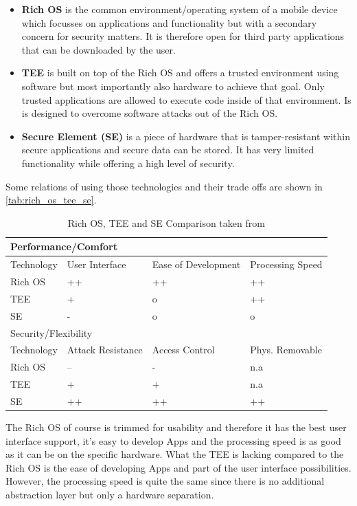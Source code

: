 \begin{itemize}
\item \textbf{Rich OS} is the common environment/operating system of a mobile device which focusses on applications and functionality but with a secondary concern for security matters. It is therefore open for third party applications
that can be downloaded by the user.
\item \textbf{TEE} is built on top of the Rich OS and offers a trusted environment using software but most importantly also hardware to achieve that goal. Only trusted applications are allowed to execute code inside of that environment. Is is designed to overcome software attacks out of the Rich OS.
\item \textbf{Secure Element (SE)} is a piece of hardware that is tamper-resistant within secure applications and secure data can be stored. It has very limited functionality while offering a high level of security.
\end{itemize}
Some relations of using those technologies and their trade offs are shown in \autoref{tab:rich_os_tee_se}.
\begin{table}[htb]
  \caption[Rich OS, TEE and SE Comparison]{Rich OS, TEE and SE Comparison taken from \parencite{tee_guide}}
  \label{tab:rich_os_tee_se}
  \begin{tabular}{l l l l}
  \toprule
  \multicolumn{4}{l}{Performance/Comfort}\\
  \midrule
  Technology & User Interface & Ease of Development & Processing Speed \\
  \midrule
  Rich OS & ++ & ++ & ++ \\
  TEE     & +  & o  & ++ \\
  SE      & -  & o  & o  \\
  \bottomrule
  \multicolumn{4}{l}{Security/Flexibility}\\
  \midrule
  Technology & Attack Resistance & Access Control & Phys. Removable \\
  \midrule
  Rich OS & -- & - & n.a\\
  TEE & + & + & n.a \\
  SE & ++ & ++ & ++ \\
  \bottomrule
  \end{tabular}
\end{table}
The Rich OS of course is trimmed for usability and therefore it has the best
user interface support, it's easy to develop Apps and the processing speed is as good as it can be on the specific hardware. What the TEE is lacking compared to the Rich OS is the ease of developing Apps and part of the user interface possibilities. However, the processing speed is quite the same since there is no additional abstraction layer but only a hardware separation.
